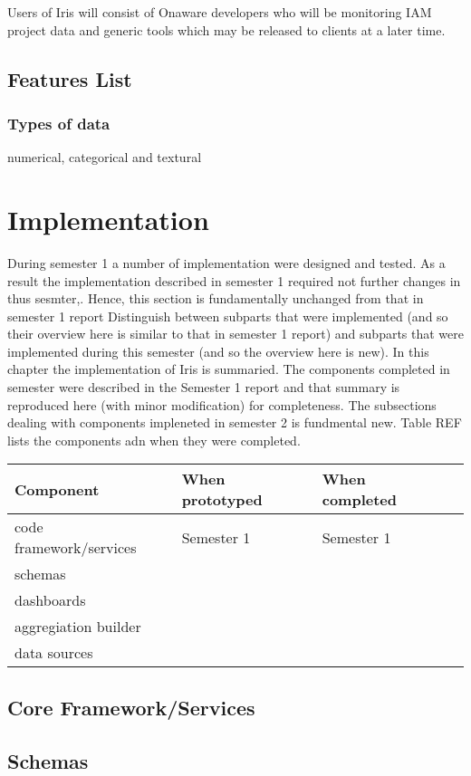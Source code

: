 \documentclass[12pt,a4paper,titlepage]{report}
\begin{document}
Users of Iris will consist of Onaware developers who will be monitoring IAM project data and generic tools which may be released to clients at a later time.

\section{Features List}
\subsection{Types of data}
numerical, categorical and textural

\chapter{Implementation}
During semester 1 a number of implementation were designed and tested. As a result the implementation described in
semester 1 required not further changes in thus sesmter,. Hence, this section is fundamentally unchanged from that in
semester 1 report
Distinguish between subparts that were implemented (and so their overview here is similar to that in semester 1 report) and
subparts that were implemented during this semester (and so the overview here is new).
In this chapter the implementation of Iris is summaried. The components completed in semester were described in the
Semester 1 report and that summary is reproduced here (with minor modification) for completeness. The subsections dealing
with components impleneted in semester 2 is fundmental new. Table REF lists the components adn when they were completed.
\begin{center}
\begin{tabular}{llll}
Component                         & When prototyped  & When completed \\\hline
code framework/services  & Semester 1 & Semester 1 \\
schemas &\\
dashboards &\\
aggregiation builder  &\\
data sources & \\
\end{tabular}
\end{center}

\section{Core Framework/Services}
\section{Schemas}
\end{document}
